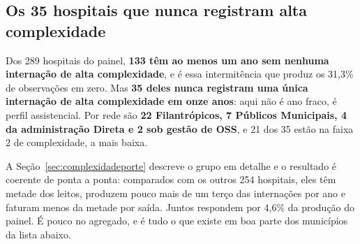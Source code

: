 \subsection{Os 35 hospitais que nunca registram alta complexidade}
\label{ap:listaalta}

Dos 289 hospitais do painel, \textbf{133 têm ao menos um ano sem nenhuma
internação de alta complexidade}, e é essa intermitência que produz os
31,3\% de observações em zero. Mas \textbf{35 deles nunca registram uma
única internação de alta complexidade em onze anos}: aqui não é ano fraco,
é perfil assistencial. Por rede são \textbf{22 Filantrópicos, 7 Públicos
Municipais, 4 da administração Direta e 2 sob gestão de OSS}, e 21 dos 35
estão na faixa 2 de complexidade, a mais baixa.

A Seção~\ref{sec:complexidadeporte} descreve o grupo em detalhe e o
resultado é coerente de ponta a ponta: comparados com os outros 254
hospitais, eles têm metade dos leitos, produzem pouco mais de um terço das
internações por ano e faturam menos da metade por saída. Juntos respondem
por 4,6\% da produção do painel. É pouco no agregado, e é tudo o que existe
em boa parte dos municípios da lista abaixo.

